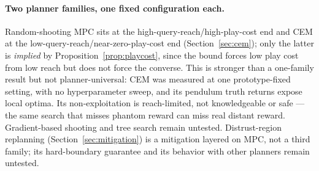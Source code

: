 \documentclass[11pt]{article}
\theoremstyle{definition}
\theoremstyle{remark}
\begin{document}
\paragraph{Two planner families, one fixed configuration each.} Random-shooting MPC sits at the high-query-reach/high-play-cost end and CEM at the low-query-reach/near-zero-play-cost end (Section~\ref{sec:cem}); only the latter is \emph{implied} by Proposition~\ref{prop:playcost}, since the bound forces low play cost from low reach but does not force the converse. This is stronger than a one-family result but not planner-universal: CEM was measured at one prototype-fixed setting, with no hyperparameter sweep, and its pendulum truth returns expose local optima. Its non-exploitation is reach-limited, not knowledgeable or safe --- the same search that misses phantom reward can miss real distant reward. Gradient-based shooting and tree search \citep{coulom2006mcts,kocsis2006bandit} remain untested. Distrust-region replanning (Section~\ref{sec:mitigation}) is a mitigation layered on MPC, not a third family; its hard-boundary guarantee and its behavior with other planners remain untested.
\end{document}
